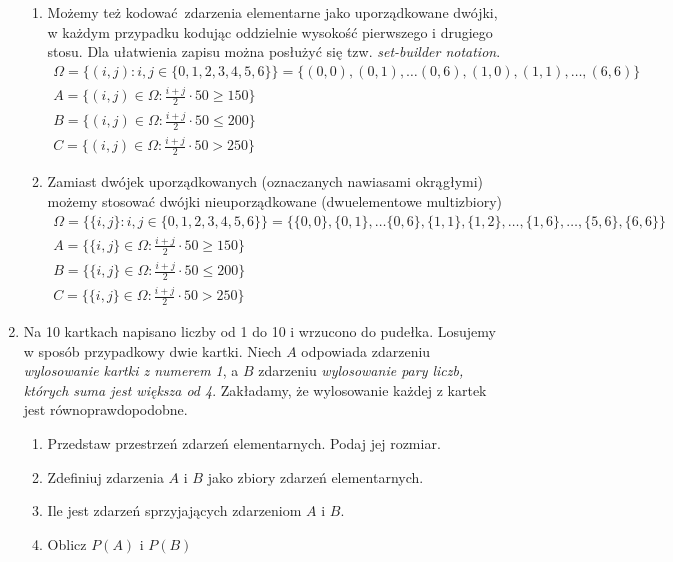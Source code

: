 \documentclass[twoside]{mwart}
\newcommand{\ans}[1]{}
\newenvironment{ansenv}{\comment}{\endcomment}
\newenvironment{ansenv}{\paragraph{Odpowiedź:}}{}
\newcommand{\ans}[1]{\begin{ansenv}#1\end{ansenv}}
\begin{document}
\begin{enumerate}
{\begin{enumerate}
\begin{enumerate}
\begin{gather*}
			B = \{0, 25, \ldots, 200\} \\
			C = \{275, 300\}
			\end{gather*}
			\item Możemy też kodować zdarzenia elementarne jako uporządkowane dwójki, w każdym przypadku kodując oddzielnie wysokość pierwszego i drugiego stosu. Dla ułatwienia zapisu można posłużyć się tzw. \emph{set-builder notation}.
			\begin{gather*}
			\Omega = \{ (i,j) \colon i,j\in\{0,1,2,3,4,5,6\}\}=\{(0,0), (0, 1), \ldots (0,6), (1,0), (1,1), \ldots, (6,6) \} \\
			A=\{(i,j)\in\Omega \colon \frac{i+j}{2}\cdot 50 \geq 150 \}	\\		
			B=\{(i,j)\in\Omega \colon \frac{i+j}{2}\cdot 50 \leq 200 \}\\
			C=\{(i,j)\in\Omega \colon \frac{i+j}{2}\cdot 50 > 250 \}
			\end{gather*}
			\item Zamiast dwójek uporządkowanych (oznaczanych nawiasami okrągłymi) możemy stosować dwójki nieuporządkowane (dwuelementowe multizbiory)
			\begin{gather*}
			\Omega = \{ \{i,j\} \colon i,j\in\{0,1,2,3,4,5,6\}\}=\{\{0,0\}, \{0, 1\}, \ldots \{0,6\}, \{1,1\}, \{1,2\}, \ldots, \{1,6\}, \ldots, \{5,6\}, \{6,6\} \} \\
			A=\{\{i,j\}\in\Omega \colon \frac{i+j}{2}\cdot 50 \geq 150 \}	\\		
			B=\{\{i,j\}\in\Omega \colon \frac{i+j}{2}\cdot 50 \leq 200 \} \\
			C=\{\{i,j\}\in\Omega \colon \frac{i+j}{2}\cdot 50 > 250 \}
			\end{gather*}
		\end{enumerate}
	\end{enumerate}
}
\item Na 10 kartkach napisano liczby od 1 do 10 i wrzucono do pudełka. Losujemy w sposób przypadkowy dwie kartki. Niech $A$ odpowiada zdarzeniu \emph{wylosowanie kartki z numerem 1}, a $B$ zdarzeniu \emph{wylosowanie pary liczb, których suma jest większa od 4}. Zakładamy, że wylosowanie każdej z kartek jest równoprawdopodobne.
\begin{enumerate}
\item Przedstaw przestrzeń zdarzeń elementarnych. Podaj jej rozmiar. \ans{$\Omega=\{\{i,j\}|i,j\in\{1,\ldots,10\} \land i\neq j\}, \left|\Omega\right|={10 \choose 2}=45$}
\item Zdefiniuj zdarzenia $A$ i $B$ jako zbiory zdarzeń elementarnych. \ans{$A=\{\{i,j\}\in\Omega|i=1 \lor j=1\}$, $B=\{\{i,j\}\in\Omega|i+j>4\}$}
\item Ile jest zdarzeń sprzyjających zdarzeniom $A$ i $B$. \ans{$\left|A\right|=9$, $\left|B\right|=45-4=41$}
\item Oblicz $P(A)$ i $P(B)$ \ans{$P(A)=\frac{9}{45}, P(B)=\frac{41}{45}$}


\end{enumerate}
\end{enumerate}
\end{document}
